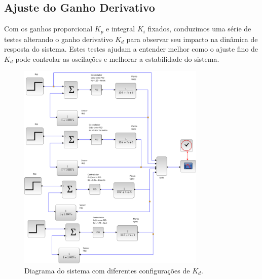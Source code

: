 \subsection{Ajuste do Ganho Derivativo}
Com os ganhos proporcional \( K_p \) e integral \( K_i \) fixados, conduzimos uma série de testes alterando o ganho derivativo \( K_d \) para observar seu impacto na dinâmica de resposta do sistema. Estes testes ajudam a entender melhor como o ajuste fino de \( K_d \) pode controlar as oscilações e melhorar a estabilidade do sistema.

\begin{figure}[H]
    \centering
    \includegraphics[width=0.8\textwidth]{6-atividade/assets/diagrama-pid-ajustando-kd.png}
    \caption{Diagrama do sistema com diferentes configurações de \( K_d \).}
    \label{fig:diagram-pid-adjusting-kd}
\end{figure}

